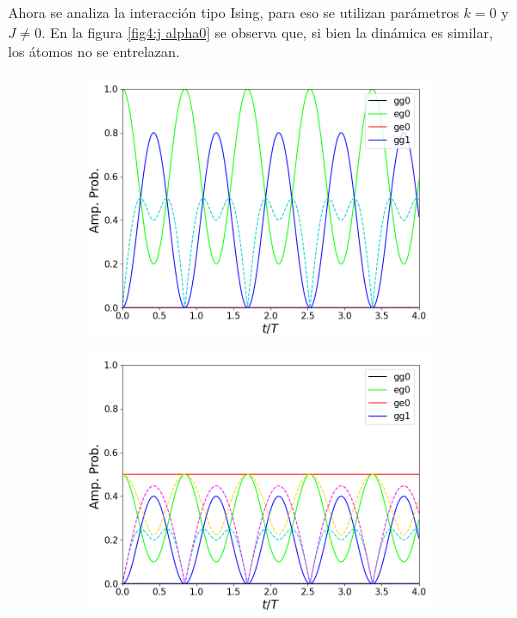 Ahora se analiza la interacción tipo Ising, para eso se utilizan parámetros $k=0$ y $J\neq 0$. En la figura \ref{fig4:j alpha0} se observa que, si bien la dinámica es similar, los átomos no se entrelazan.

\begin{figure}[H]
    \centering
    \begin{subfigure}{0.49\textwidth}
        \includegraphics[width=\textwidth]{figuras/ch4/j eg0 abc.png}
        \caption{}
        \label{fig4:pob j eg0}
    \end{subfigure}
    \hfill
    \begin{subfigure}{0.49\textwidth}
        \includegraphics[width=\textwidth]{figuras/ch4/j eg0+ge0 abc.png}

\end{subfigure}
\end{figure}
